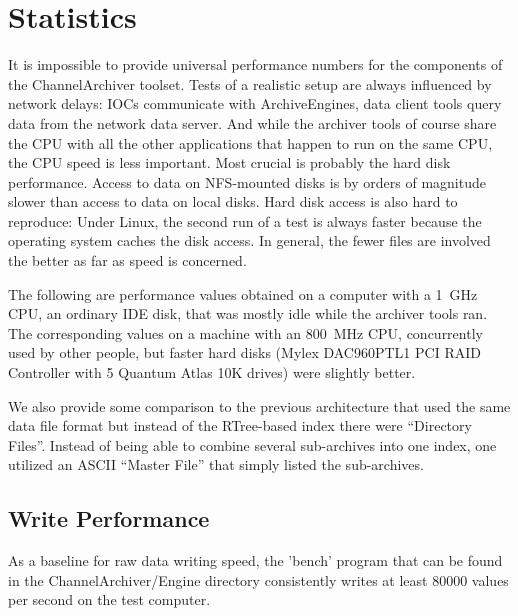 \section{Statistics}
It is impossible to provide universal performance numbers for the
components of the ChannelArchiver toolset. Tests of a realistic setup
are always influenced by network delays: IOCs communicate with ArchiveEngines,
data client tools query data from the network data server.
And while the archiver tools of course share the CPU with all the
other applications that happen to run on the same CPU,
the CPU speed is less important. Most crucial is probably the hard
disk performance. Access to data on NFS-mounted disks is by orders of
magnitude slower than access to data on local disks.
Hard disk access is also hard to reproduce: Under Linux, the second
run of a test is always faster because the operating system caches the
disk access. In general, the fewer files are involved the better as
far as speed is concerned.

The following are performance values obtained on a computer
with a 1~GHz CPU, an ordinary IDE disk, that was mostly idle
while the archiver tools ran. %
The corresponding values on a machine with an 800~MHz CPU, concurrently
used by other people, but faster hard disks (Mylex
DAC960PTL1 PCI RAID Controller with 5 Quantum Atlas 10K drives) were
slightly better. %

We also provide some comparison to the previous architecture that used
the same data file format but instead of the RTree-based index there
were ``Directory Files''. Instead of being able to combine several sub-archives
into one index, one utilized an ASCII ``Master File'' that simply listed the
sub-archives.

\subsection{Write Performance}
As a baseline for raw data writing speed, the 'bench' program that can
be found in the ChannelArchiver/Engine directory consistently writes
at least 80000 values per second on the test computer.

